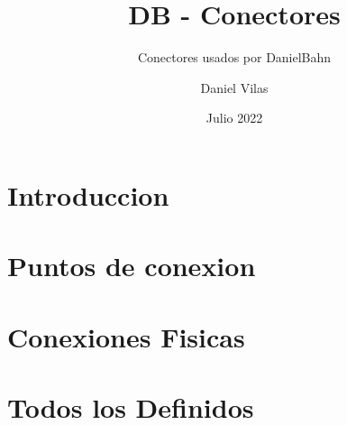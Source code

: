 \documentclass[spanish]{DccDiyTools/DccDiyTools}
\title{DB - Conectores}
\subtitle{Conectores usados por DanielBahn}
\author{Daniel Vilas}
\date{Julio 2022}
\begin{document}
\maketitle
\newpage
\section{Introduccion}

\newpage
\section{Puntos de conexion}


\newpage
\section{Conexiones Fisicas}


\newpage
\section{Todos los Definidos}

\end{document}
